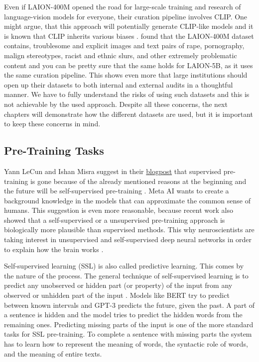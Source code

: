 \documentclass[
]{krantz}
\begin{document}
Even if LAION-400M opened the road for large-scale training and research of language-vision models for everyone, their curation pipeline involves CLIP. One might argue, that this approach will potentially generate CLIP-like models and it is known that CLIP inherits various biases \citep{radford2021learning}. \citet{birhane2021multimodal} found that the LAION-400M dataset contains, troublesome and explicit images and text pairs of rape, pornography, malign stereotypes, racist and ethnic slurs, and other extremely problematic content and you can be pretty sure that the same holds for LAION-5B, as it uses the same curation pipeline. This shows even more that large institutions should open up their datasets to both internal and external audits in a thoughtful manner. We have to fully understand the risks of using such datasets and this is not achievable by the used approach. Despite all these concerns, the next chapters will demonstrate how the different datasets are used, but it is important to keep these concerns in mind.

\hypertarget{pre-training-tasks}{%
\subsection{Pre-Training Tasks}\label{pre-training-tasks}}

Yann LeCun and Ishan Misra suggest in their \href{https://ai.facebook.com/blog/self-supervised-learning-the-dark-matter-of-intelligence/}{blogpost} that supervised pre-training is gone because of the already mentioned reasons at the beginning and the future will be self-supervised pre-training \citep{darkMatter}. Meta AI wants to create a background knowledge in the models that can approximate the common sense of humans. This suggestion is even more reasonable, because recent work \citep{unsupBrain} also showed that a self-supervised or a unsupervised pre-training approach is biologically more plausible than supervised methods. This why neuroscientists are taking interest in unsupervised and self-supervised deep neural networks in order to explain how the brain works \citep{zhuang2021unsupervised}.

Self-supervised learning (SSL) is also called predictive learning. This comes by the nature of the process. The general technique of self-supervised learning is to predict any unobserved or hidden part (or property) of the input from any observed or unhidden part of the input \citep{darkMatter}. Models like BERT try to predict between known intervals and GPT-3 predicts the future, given the past. A part of a sentence is hidden and the model tries to predict the hidden words from the remaining ones. Predicting missing parts of the input is one of the more standard tasks for SSL pre-training. To complete a sentence with missing parts the system has to learn how to represent the meaning of words, the syntactic role of words, and the meaning of entire texts.
\end{document}
